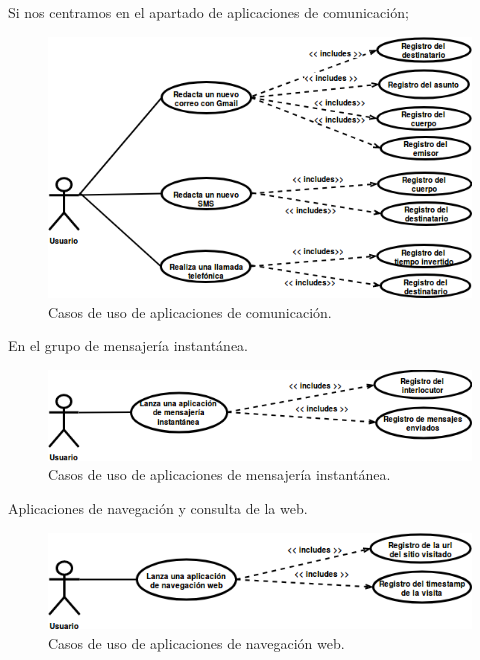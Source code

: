\documentclass[12pt,a4paper,oneside]{book} %
\begin{document}
\pagebreak
Si nos centramos en el apartado de aplicaciones de comunicación; 
\begin{figure}[H]
	\begin{center}
		\includegraphics[scale=0.70]{pictures/usecases/usecases02.png} %
	\end{center}
	\caption[Casos de uso 02]{Casos de uso de aplicaciones de comunicación.}
\end{figure}
En el grupo de mensajería instantánea.
\begin{figure}[H]
	\begin{center}
		\includegraphics[scale=0.70]{pictures/usecases/usecases03.png} %
	\end{center}
	\caption[Casos de uso 03]{Casos de uso de aplicaciones de mensajería instantánea.}
\end{figure}
Aplicaciones de navegación y consulta de la web. 
\begin{figure}[H]
	\begin{center}
		\includegraphics[scale=0.70]{pictures/usecases/usecases04.png} %
	\end{center}
	\caption[Casos de uso 04]{Casos de uso de aplicaciones de navegación web.}
\end{figure}
\end{document}
